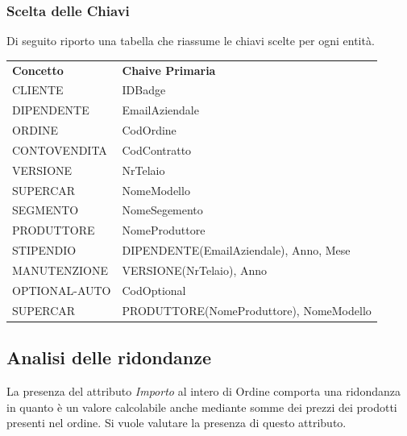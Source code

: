 \documentclass[11pt]{article}
\begin{document}
\subsubsection{Scelta delle Chiavi}

Di seguito riporto una tabella che riassume le chiavi scelte per ogni entità.

\begin{center}
    \begin{table}[htbp]
        \centering
        \small
        \begin{tabularx}{\textwidth}{l l}
            \rowcolor{red!20!}
            \textbf{Concetto} & \textbf{Chaive Primaria}\\
            CLIENTE & IDBadge \\
            DIPENDENTE & EmailAziendale \\
            ORDINE & CodOrdine \\
            CONTOVENDITA & CodContratto \\
            VERSIONE & NrTelaio \\
            SUPERCAR & NomeModello \\
            SEGMENTO & NomeSegemento \\
            PRODUTTORE & NomeProduttore \\
            STIPENDIO & DIPENDENTE(EmailAziendale), Anno, Mese \\
            MANUTENZIONE & VERSIONE(NrTelaio), Anno \\
            OPTIONAL-AUTO & CodOptional \\
            SUPERCAR & PRODUTTORE(NomeProduttore), NomeModello \\
        \end{tabularx}
    \end{table}    
\end{center}

\newpage

\subsection{Analisi delle ridondanze}

La presenza del attributo \textit{Importo} al intero di Ordine comporta una
ridondanza in quanto è un valore calcolabile anche mediante somme dei prezzi dei
prodotti presenti nel ordine. Si vuole valutare la presenza di questo attributo.\\
\end{document}
